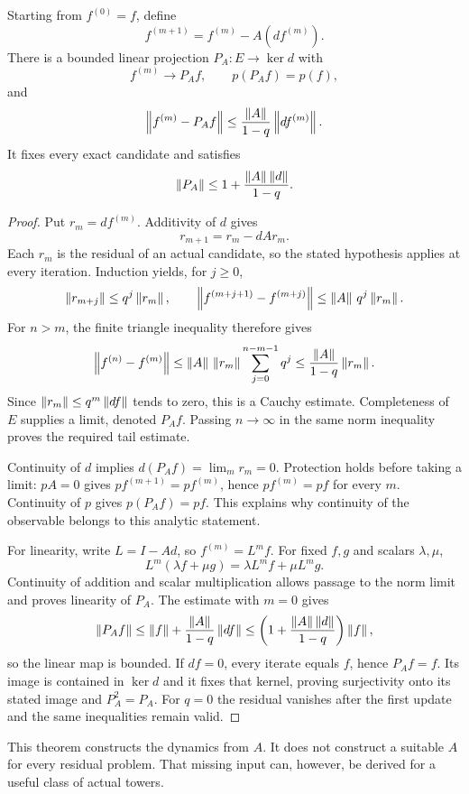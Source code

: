 \begin{KStheorem}\label{KS:KS19}
Starting from \(f^{(0)}=f\), define
\[
 f^{(m+1)}=f^{(m)}-A(df^{(m)}).
\]
There is a bounded linear projection \(P_A:E\to\ker d\) with
\[
 f^{(m)}\longrightarrow P_Af,\qquad p(P_Af)=p(f),
\]
and
\[
 \left\lVert f^{(m)}-P_Af\right\rVert
 \le\frac{\left\lVert A\right\rVert}{1-q}\left\lVert df^{(m)}\right\rVert.
\]
It fixes every exact candidate and satisfies
\[
 \left\lVert P_A\right\rVert\le1+\frac{\left\lVert A\right\rVert\left\lVert d\right\rVert}{1-q}.
\]
\end{KStheorem}
\begin{proof}
Put $r_m=df^{(m)}$. Additivity of $d$ gives
\[
 r_{m+1}=r_m-dAr_m.
\]
Each $r_m$ is the residual of an actual candidate, so the stated hypothesis applies at every iteration. Induction yields, for $j\ge0$,
\[
 \left\lVert r_{m+j}\right\rVert\le q^j\left\lVert r_m\right\rVert,\qquad
 \left\lVert f^{(m+j+1)}-f^{(m+j)}\right\rVert
 \le\left\lVert A\right\rVert\,q^j\left\lVert r_m\right\rVert.
\]
For $n>m$, the finite triangle inequality therefore gives
\[
 \left\lVert f^{(n)}-f^{(m)}\right\rVert
 \le\left\lVert A\right\rVert\,\left\lVert r_m\right\rVert\sum_{j=0}^{n-m-1}q^j
 \le\frac{\left\lVert A\right\rVert}{1-q}\left\lVert r_m\right\rVert.
\]
Since $\left\lVert r_m\right\rVert\le q^m\left\lVert df\right\rVert$ tends to zero, this is a Cauchy estimate. Completeness of $E$ supplies a limit, denoted $P_Af$. Passing $n\to\infty$ in the same norm inequality proves the required tail estimate.

Continuity of $d$ implies $d(P_Af)=\lim_m r_m=0$. Protection holds before taking a limit: $pA=0$ gives $pf^{(m+1)}=pf^{(m)}$, hence $pf^{(m)}=pf$ for every $m$. Continuity of $p$ gives $p(P_Af)=pf$. This explains why continuity of the observable belongs to this analytic statement.

For linearity, write $L=I-Ad$, so $f^{(m)}=L^mf$. For fixed $f,g$ and scalars $\lambda,\mu$,
\[
 L^m(\lambda f+\mu g)=\lambda L^mf+\mu L^mg.
\]
Continuity of addition and scalar multiplication allows passage to the norm limit and proves linearity of $P_A$. The estimate with $m=0$ gives
\[
 \left\lVert P_Af\right\rVert\le\left\lVert f\right\rVert+\frac{\left\lVert A\right\rVert}{1-q}\left\lVert df\right\rVert
 \le\left(1+\frac{\left\lVert A\right\rVert\left\lVert d\right\rVert}{1-q}\right)\left\lVert f\right\rVert,
\]
so the linear map is bounded. If $df=0$, every iterate equals $f$, hence $P_Af=f$. Its image is contained in $\ker d$ and it fixes that kernel, proving surjectivity onto its stated image and $P_A^2=P_A$. For $q=0$ the residual vanishes after the first update and the same inequalities remain valid.
\end{proof}
This theorem constructs the dynamics from \(A\). It does not construct a suitable \(A\) for every residual problem. That missing input can, however, be derived for a useful class of actual towers.

